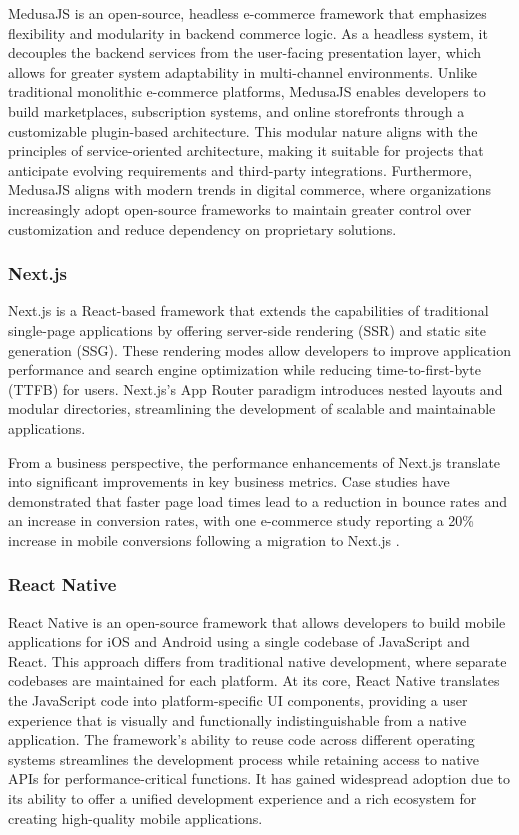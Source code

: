MedusaJS is an open-source, headless e-commerce framework that emphasizes flexibility and modularity in backend commerce logic. As a headless system, it decouples the backend services from the user-facing presentation layer, which allows for greater system adaptability in multi-channel environments. Unlike traditional monolithic e-commerce platforms, MedusaJS enables developers to build marketplaces, subscription systems, and online storefronts through a customizable plugin-based architecture. This modular nature aligns with the principles of service-oriented architecture, making it suitable for projects that anticipate evolving requirements and third-party integrations. \cite{medusa2025platform} Furthermore, MedusaJS aligns with modern trends in digital commerce, where organizations increasingly adopt open-source frameworks to maintain greater control over customization and reduce dependency on proprietary solutions.

\subsubsection{Next.js}
Next.js \cite{nextjs2025docs} is a React-based framework that extends the capabilities of traditional single-page applications by offering server-side rendering (SSR) and static site generation (SSG). These rendering modes allow developers to improve application performance and search engine optimization while reducing time-to-first-byte (TTFB) for users. Next.js’s App Router paradigm introduces nested layouts and modular directories, streamlining the development of scalable and maintainable applications. 

From a business perspective, the performance enhancements of Next.js translate into significant improvements in key business metrics. Case studies have demonstrated that faster page load times lead to a reduction in bounce rates and an increase in conversion rates, with one e-commerce study reporting a 20\% increase in mobile conversions following a migration to Next.js \cite{shah2025nextjs}.

\subsubsection{React Native}
React Native is an open-source framework that allows developers to build mobile applications for iOS and Android using a single codebase of JavaScript and React. This approach differs from traditional native development, where separate codebases are maintained for each platform. At its core, React Native translates the JavaScript code into platform-specific UI components, providing a user experience that is visually and functionally indistinguishable from a native application. The framework's ability to reuse code across different operating systems streamlines the development process while retaining access to native APIs for performance-critical functions. It has gained widespread adoption due to its ability to offer a unified development experience and a rich ecosystem for creating high-quality mobile applications. \cite{reactnative2025intro}

